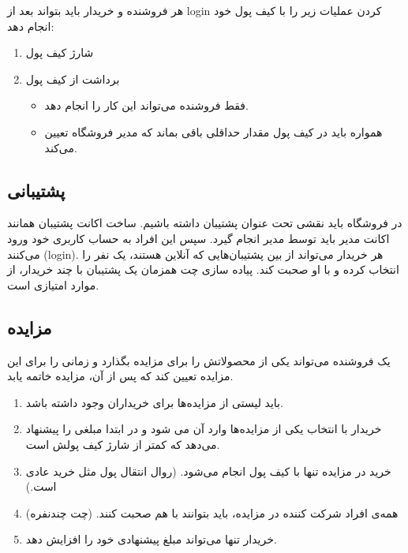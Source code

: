\documentclass[]{article}
\begin{document}
هر فروشنده و خریدار باید بتواند بعد از login کردن عملیات زیر را با کیف پول خود انجام دهد:

\begin{enumerate}


\item
شارژ کیف پول

\item
برداشت از کیف پول

\begin{itemize}[label=$\blacksquare$]
\item
فقط فروشنده می‌تواند این کار را انجام دهد.

\item
همواره باید در کیف پول مقدار حداقلی باقی بماند که مدیر فروشگاه تعیین می‌کند.

\end{itemize}

\end{enumerate}


\subsection*{{\titr پشتیبانی}}

در فروشگاه باید نقشی تحت عنوان پشتیبان داشته باشیم. ساخت اکانت پشتیبان همانند اکانت \textcolor{CustomColor}{مدیر} باید توسط مدیر انجام گیرد. سپس این افراد به حساب کاربری خود ورود می‌کنند (‌login).  هر خریدار می‌تواند از بین پشتیبان‌هایی که آنلاین هستند، یک نفر را انتخاب کرده و با او صحبت کند. پیاده سازی چت همزمان یک پشتیبان با چند خریدار، از موارد امتیازی است.

\subsection*{{\titr مزایده}}

یک فروشنده می‌تواند یکی از محصولاتش را برای مزایده بگذارد و زمانی را برای این مزایده تعیین کند که پس از آن، مزایده خاتمه یابد. 

\begin{enumerate}

\item
باید لیستی از مزایده‌ها برای خریداران وجود داشته باشد.

\item
خریدار با انتخاب یکی از مزایده‌ها وارد آن می شود و در ابتدا مبلغی را پیشنهاد می‌دهد که کمتر از شارژ کیف پولش است.

\item
خرید در مزایده تنها با کیف پول انجام می‌شود. (روال انتقال پول مثل خرید عادی است.)

\item
همه‌ی افراد شرکت کننده در مزایده، باید بتوانند با هم صحبت کنند. (چت چندنفره)

\item
خریدار تنها می‌تواند مبلغ پیشنهادی خود را افزایش دهد.


\end{enumerate}
\end{document}
